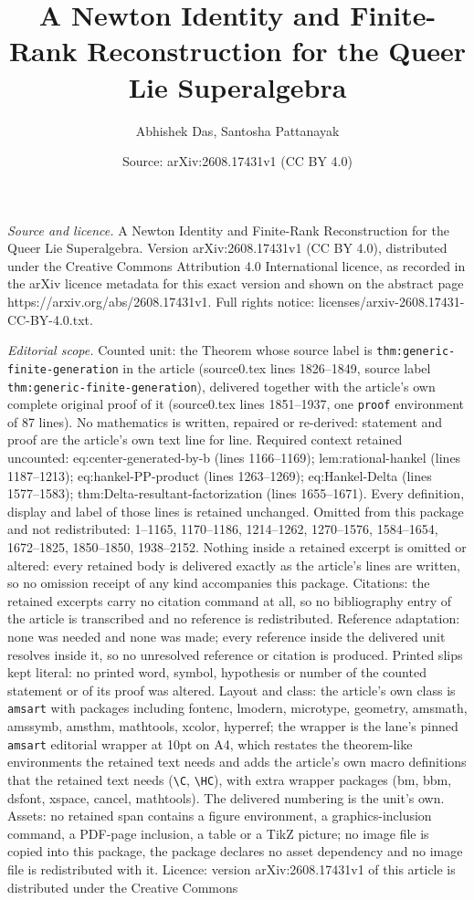 \documentclass[10pt,a4paper]{amsart}
\title[A Newton Identity and Finite-Rank Reconstruction for the Que]{A Newton Identity and Finite-Rank Reconstruction for the Queer Lie Superalgebra}
\author{Abhishek Das, Santosha Pattanayak}
\date{Source: arXiv:2608.17431v1 (CC BY 4.0)}
\begin{document}
\maketitle

\noindent\emph{Source and licence.} A Newton Identity and Finite-Rank Reconstruction for the Queer Lie Superalgebra. Version arXiv:2608.17431v1 (CC BY 4.0), distributed under the Creative Commons Attribution 4.0 International licence, as recorded in the arXiv licence metadata for this exact version and shown on the abstract page https://arxiv.org/abs/2608.17431v1. Full rights notice: licenses/arxiv-2608.17431-CC-BY-4.0.txt.\par\smallskip

\noindent\textit{Editorial scope.} Counted unit: the Theorem whose source label is \texttt{thm:generic-finite-generation} in the article (source0.tex lines 1826--1849, source label \texttt{thm:generic-finite-generation}), delivered together with the article's own complete original proof of it (source0.tex lines 1851--1937, one \texttt{proof} environment of 87 lines). No mathematics is written, repaired or re-derived: statement and proof are the article's own text line for line. Required context retained uncounted: eq:center-generated-by-b (lines 1166--1169); lem:rational-hankel (lines 1187--1213); eq:hankel-PP-product (lines 1263--1269); eq:Hankel-Delta (lines 1577--1583); thm:Delta-resultant-factorization (lines 1655--1671). Every definition, display and label of those lines is retained unchanged. Omitted from this package and not redistributed: 1--1165, 1170--1186, 1214--1262, 1270--1576, 1584--1654, 1672--1825, 1850--1850, 1938--2152. Nothing inside a retained excerpt is omitted or altered: every retained body is delivered exactly as the article's lines are written, so no omission receipt of any kind accompanies this package. Citations: the retained excerpts carry no citation command at all, so no bibliography entry of the article is transcribed and no reference is redistributed. Reference adaptation: none was needed and none was made; every reference inside the delivered unit resolves inside it, so no unresolved reference or citation is produced. Printed slips kept literal: no printed word, symbol, hypothesis or number of the counted statement or of its proof was altered. Layout and class: the article's own class is \texttt{amsart} with packages including fontenc, lmodern, microtype, geometry, amsmath, amssymb, amsthm, mathtools, xcolor, hyperref; the wrapper is the lane's pinned \texttt{amsart} editorial wrapper at 10pt on A4, which restates the theorem-like environments the retained text needs and adds the article's own macro definitions that the retained text needs (\texttt{\textbackslash C}, \texttt{\textbackslash HC}), with extra wrapper packages (bm, bbm, dsfont, xspace, cancel, mathtools). The delivered numbering is the unit's own. Assets: no retained span contains a figure environment, a graphics-inclusion command, a PDF-page inclusion, a table or a TikZ picture; no image file is copied into this package, the package declares no asset dependency and no image file is redistributed with it. Licence: version arXiv:2608.17431v1 of this article is distributed under the Creative Commons 
\end{document}
